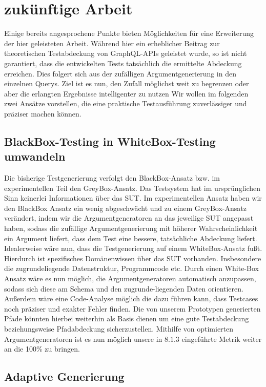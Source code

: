 \chapter{zukünftige Arbeit}

Einige bereits angesprochene Punkte bieten Möglichkeiten für eine Erweiterung der hier geleisteten Arbeit.
Während hier ein erheblicher Beitrag zur theoretischen Testabdeckung von GraphQL-APIs geleistet wurde,
so ist nicht garantiert, dass die entwickelten Tests tatsächlich die ermittelte Abdeckung erreichen.
Dies folgert sich aus der zufälligen Argumentgenerierung in den einzelnen Querys.
Ziel ist es nun, den Zufall möglichst weit zu begrenzen oder aber die erlangten Ergebnisse intelligenter zu nutzen
Wir wollen im folgenden zwei Ansätze vorstellen, die eine praktische Testausführung zuverlässiger und
präziser machen können.

\section{BlackBox-Testing in WhiteBox-Testing umwandeln}

Die bisherige Testgenerierung verfolgt den BlackBox-Ansatz bzw. im experimentellen Teil den GreyBox-Ansatz.
Das Testsystem hat im ursprünglichen Sinn keinerlei Informationen über das SUT.
Im experimentellen Ansatz haben wir den BlackBox Ansatz ein wenig abgeschwächt und zu einem GreyBox-Ansatz verändert, indem wir
die Argumentgeneratoren an das jeweilige SUT angepasst haben, sodass die zufällige Argumentgenerierung mit höherer Wahrscheinlichkeit
ein Argument liefert, dass dem Test eine bessere, tatsächliche Abdeckung liefert.
Idealerweise wäre nun, dass die Testgenerierung auf einem WhiteBox-Ansatz fußt.
Hierdurch ist spezifisches Domänenwissen über das SUT vorhanden.
Insbesondere die zugrundeliegende Datenstruktur, Programmcode etc.
Durch einen White-Box Ansatz wäre es nun möglich, die Argumentgeneratoren automatisch anzupassen, sodass sich diese
am Schema und den zugrunde-liegenden Daten orientieren.
Außerdem wäre eine Code-Analyse möglich die dazu führen kann, dass Testcases noch präziser und exakter Fehler finden.
Die von unserem Prototypen generierten Pfade könnten hierbei weiterhin als Basis dienen um eine gute Testabdeckung beziehungsweise Pfadabdeckung sicherzustellen.
Mithilfe von optimierten Argumentgeneratoren ist es nun möglich unsere in $8.1.3$ eingeführte Metrik weiter an die 100\% zu bringen.

\section{Adaptive Generierung}

